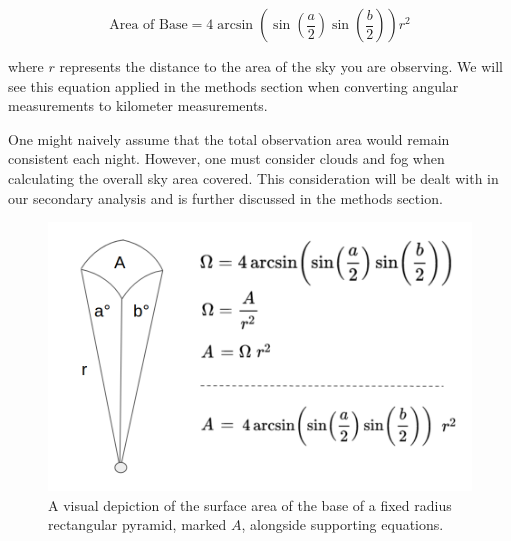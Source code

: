 \begin{equation}
    \text{Area of Base} = 
    4 \arcsin{(\sin{(\frac{a}{2})}\sin{(\frac{b}{2})})} r^2
    \label{small_area_eq}
\end{equation}

where $r$ represents the distance to the area of the sky you are observing.
We will see this equation applied in the methods section when converting angular measurements to kilometer measurements.

One might naively assume that the total observation area would remain consistent each night.
However, one must consider clouds and fog when calculating the overall sky area covered.
This consideration will be dealt with in our secondary analysis and is further discussed in the methods section.


\begin{figure}[ht!]
  \centering
  \includegraphics[scale=0.4]{images/rectangular_pyramid.png}
  \caption{A visual depiction of the surface area of the base of a fixed radius rectangular pyramid, marked $A$, alongside supporting equations.}
  \label{useful_area_equation}
\end{figure}
